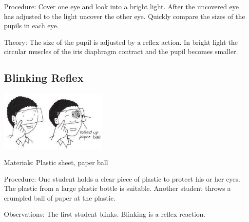 \begin{multicols}{2}
\begin{description*}
\item[Procedure:]{Cover one eye and look into a
bright light. After the uncovered
eye has adjusted to the light
uncover the other eye. Quickly
compare the sizes of the pupils in
each eye.}
\item[Theory:]{The size of the pupil is
adjusted by a reflex action. In
bright light the circular muscles of
the iris diaphragm contract and
the pupil becomes smaller.}
\end{description*}

\subsection{Blinking Reflex}

\begin{center}
\includegraphics[width=0.4\textwidth]{./img/vso/blinking.jpg}
\end{center}

\begin{description*}
\item[Materials:]{Plastic sheet, paper ball}
\item[Procedure:]{One student holds a clear piece of
plastic to protect his or her eyes.
The plastic from a large plastic
bottle is suitable. Another student
throws a crumpled ball of paper
at the plastic. }
\item[Observations:]{The first student
blinks. Blinking is a reflex
reaction.}
\end{description*}


\end{multicols}
